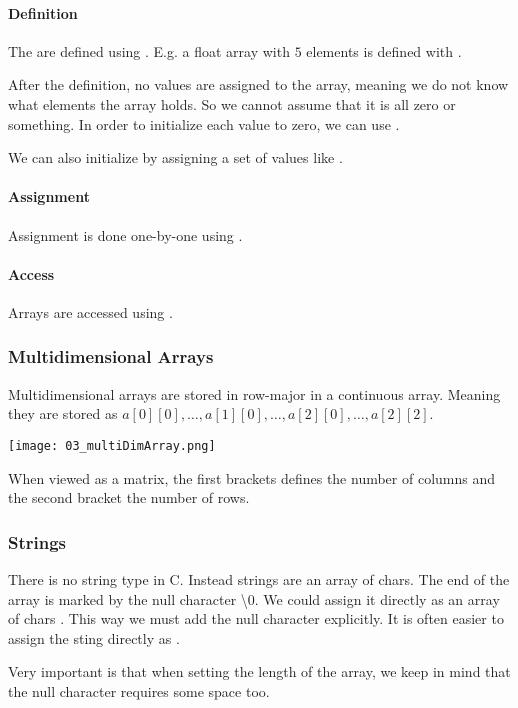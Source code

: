 \paragraph{Definition}
The are defined using . E.g. a float array with $5$ elements is defined with .

After the definition, no values are assigned to the array, meaning we do not know what elements the array holds. So we cannot assume that it is all zero or something. In order to initialize each value to zero, we can use .

We can also initialize by assigning a set of values like .

\paragraph{Assignment}
Assignment is done one-by-one using .

\paragraph{Access}
Arrays are accessed using .

\subsubsection{Multidimensional Arrays}
Multidimensional arrays are stored in row-major in a continuous array. Meaning they are stored as $a[0][0], \dots, a[1][0], \dots, a[2][0], \dots, a[2][2]$.

\texttt{[image: 03\_multiDimArray.png]}

When viewed as a matrix, the first brackets defines the number of columns and the second bracket the number of rows.

\subsubsection{Strings}
There is no string type in C. Instead strings are an array of chars. The end of the array is marked by the null character \textbackslash 0. We could assign it directly as an array of chars . This way we must add the null character explicitly. It is often easier to assign the sting directly as .

Very important is that when setting the length of the array, we keep in mind that the null character requires some space too.

